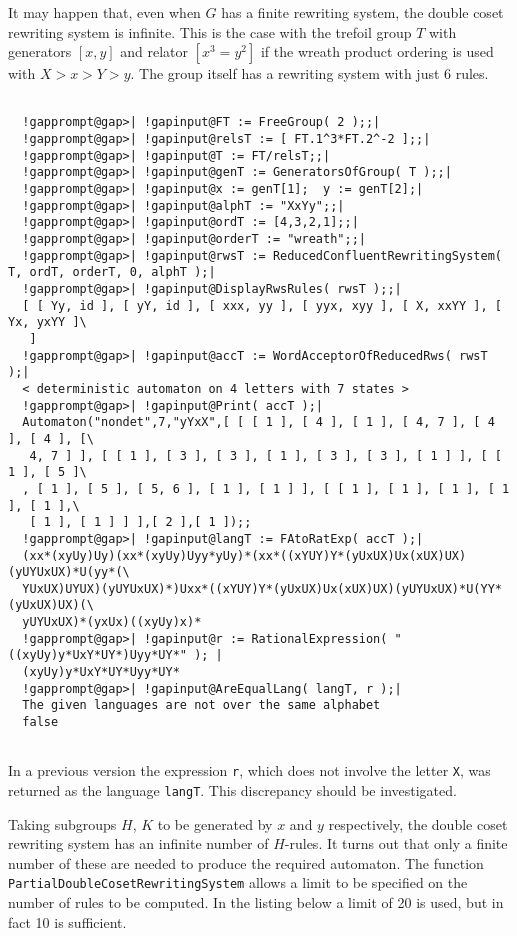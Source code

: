 \documentclass[a4paper,11pt]{report}
\begin{document}
{{{ It may happen that, even when $G$ has a finite rewriting system, the double coset rewriting system is infinite.
This is the case with the trefoil group $T$ with generators $[x,y]$ and relator $[x^3 = y^2]$ if the wreath product ordering is used with $X > x > Y > y$. The group itself has a rewriting system with just 6 rules. }

 
\begin{Verbatim}[commandchars=!@|,fontsize=\small,frame=single,label=Example]
  
  !gapprompt@gap>| !gapinput@FT := FreeGroup( 2 );;|
  !gapprompt@gap>| !gapinput@relsT := [ FT.1^3*FT.2^-2 ];;|
  !gapprompt@gap>| !gapinput@T := FT/relsT;;|
  !gapprompt@gap>| !gapinput@genT := GeneratorsOfGroup( T );;|
  !gapprompt@gap>| !gapinput@x := genT[1];  y := genT[2];|
  !gapprompt@gap>| !gapinput@alphT := "XxYy";;|
  !gapprompt@gap>| !gapinput@ordT := [4,3,2,1];;|
  !gapprompt@gap>| !gapinput@orderT := "wreath";;|
  !gapprompt@gap>| !gapinput@rwsT := ReducedConfluentRewritingSystem( T, ordT, orderT, 0, alphT );|
  !gapprompt@gap>| !gapinput@DisplayRwsRules( rwsT );;|
  [ [ Yy, id ], [ yY, id ], [ xxx, yy ], [ yyx, xyy ], [ X, xxYY ], [ Yx, yxYY ]\
   ]
  !gapprompt@gap>| !gapinput@accT := WordAcceptorOfReducedRws( rwsT );|
  < deterministic automaton on 4 letters with 7 states >
  !gapprompt@gap>| !gapinput@Print( accT );|
  Automaton("nondet",7,"yYxX",[ [ [ 1 ], [ 4 ], [ 1 ], [ 4, 7 ], [ 4 ], [ 4 ], [\
   4, 7 ] ], [ [ 1 ], [ 3 ], [ 3 ], [ 1 ], [ 3 ], [ 3 ], [ 1 ] ], [ [ 1 ], [ 5 ]\
  , [ 1 ], [ 5 ], [ 5, 6 ], [ 1 ], [ 1 ] ], [ [ 1 ], [ 1 ], [ 1 ], [ 1 ], [ 1 ],\
   [ 1 ], [ 1 ] ] ],[ 2 ],[ 1 ]);;
  !gapprompt@gap>| !gapinput@langT := FAtoRatExp( accT );|
  (xx*(xyUy)Uy)(xx*(xyUy)Uyy*yUy)*(xx*((xYUY)Y*(yUxUX)Ux(xUX)UX)(yUYUxUX)*U(yy*(\
  YUxUX)UYUX)(yUYUxUX)*)Uxx*((xYUY)Y*(yUxUX)Ux(xUX)UX)(yUYUxUX)*U(YY*(yUxUX)UX)(\
  yUYUxUX)*(yxUx)((xyUy)x)*
  !gapprompt@gap>| !gapinput@r := RationalExpression( "((xyUy)y*UxY*UY*)Uyy*UY*" ); |
  (xyUy)y*UxY*UY*Uyy*UY*
  !gapprompt@gap>| !gapinput@AreEqualLang( langT, r );|
  The given languages are not over the same alphabet
  false
  
\end{Verbatim}
 In a previous version the expression \texttt{r}, which does not involve the letter \texttt{X}, was returned as the language \texttt{langT}. This discrepancy should be investigated. 

 Taking subgroups $H$, $K$ to be generated by $x$ and $y$ respectively, the double coset rewriting system has an infinite number of $H$-rules. It turns out that only a finite number of these are needed to produce
the required automaton. The function \texttt{PartialDoubleCosetRewritingSystem} allows a limit to be specified on the number of rules to be computed. In the
listing below a limit of 20 is used, but in fact 10 is sufficient. 
\begin{Verbatim}[commandchars=!@|,fontsize=\small,frame=single,label=Example]
  

\end{Verbatim}}}
\end{document}
